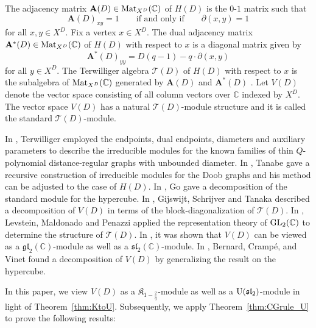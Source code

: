 \documentclass[pdftex]{sigma}%
\def\A{\mathbf A}
\def\C{\mathbb C}
\def\Mat{{\rm Mat}}
\def\T{\mathcal T}
\def\U{{\rm U}(\mathfrak{sl}_2)}
\numberwithin{equation}{section}
\begin{document}
The adjacency matrix $\A(D)\in \Mat_{X^D}(\C)$ of $H(D)$ is the $0$-$1$ matrix such that
\[
\A(D)_{xy}=1\qquad
\text{if and only if}\qquad
\partial(x,y)=1
\]
for all $x,y\in X^D$.
Fix a vertex $x\in X^D$. The dual adjacency matrix $\A^*(D)\in \Mat_{X^D}(\C)$ of $H(D)$ with respect to $x$ is a diagonal matrix given by
\[
\A^*(D)_{yy}=D(q-1)-q\cdot \partial(x,y)
\]
for all $y\in X^D$.
The Terwilliger algebra $\T(D)$ of $H(D)$ with respect to $x$ is the subalgebra of $\Mat_{X^D}(\C)$ generated by $\A(D)$ and $\A^*(D)$ \cite{TerAlgebraI,TerAlgebraII,TerAlgebraIII}.
Let $V(D)$ denote the vector space consisting of all column vectors over $\C$ indexed by $X^D$. The vector space $V(D)$ has a natural $\T(D)$-module structure and it is called the standard $\T(D)$-module.


In \cite{TerAlgebraIII}, Terwilliger employed the endpoints, dual endpoints, diameters and auxiliary parameters to describe the irreducible modules for
the known families of thin $Q$-polynomial distance-regular graphs with unbounded diameter.
In \cite{Doob1997}, Tanabe gave a recursive construction of irreducible modules for the Doob graphs and his method can be adjusted to the case of $H(D)$. In \cite{hypercube2002}, Go gave a decomposition of the standard module for the hypercube. In \cite{semidefinite2006}, Gijswijt, Schrijver and Tanaka described a decomposition of $V(D)$ in terms of the block-diagonalization of $\T(D)$. In \cite{Hamming2006}, Levstein, Maldonado and Penazzi applied the representation theory of ${\rm GL}_2(\C)$ to determine the structure of $\T(D)$. In \cite{Manila}, it was shown that $V(D)$ can be viewed as a $\mathfrak{gl}_2(\C)$-module as well as a $\mathfrak{sl}_2(\C)$-module. In \cite{Hamming:2021}, Bernard, Cramp\'{e}, and Vinet found a decomposition of $V(D)$ by generalizing the result on the hypercube.

In this paper, we view $V(D)$ as a $\mathfrak{K}_{1-\frac{2}{q}}$-module as well as a $\U$-module in light of Theorem~\ref{thm:KtoU}. Subsequently, we apply Theorem~\ref{thm:CGrule_U} to prove the following results:
\end{document}
